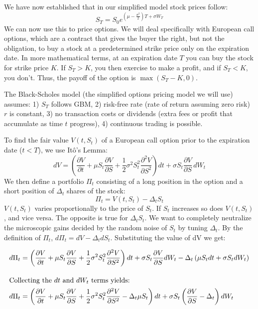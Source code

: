 \documentclass[12pt]{article}
\theoremstyle{definition}
\theoremstyle{plain}
\theoremstyle{remark}
\begin{document}
We have now established that in our simplified model stock prices follow: 
\[
S_T = S_0 e^{\left( \mu- \frac{\sigma^2}{2}\right)T + \sigma W_T}
\]
We can now use this to price options.  We will deal specifically with European call options, which are a contract that gives the buyer the right, but not the obligation, to buy a stock at a predetermined strike price only on the expiration date.  In more mathematical terms, at an expiration date $T$ you can buy the stock for strike price $K$.  If $S_T>K$, you then exercise to make a profit, and if $S_T<K$, you don't.  Thus, the payoff of the option is $\max(S_T-K,0)$.  

The Black-Scholes model (the simplified options pricing model we will use) assumes: 1) $S_T$ follows GBM, 2) risk-free rate (rate of return assuming zero risk) $r$ is constant, 3) no transaction costs or dividends (extra fees or profit that accumulate as time $t$ progress), 4) continuous trading is possible.

To find the fair value $V(t, S_t)$ of a European call option prior to the expiration date ($t<T$), we use It\^o's Lemma:
\[
dV = \left( \frac{\partial V}{\partial t} + \mu S_t\frac{\partial V}{\partial S} + \frac{1}{2} \sigma^2S_t^2 \frac{\partial^2 V}{\partial S^2} \right) dt + \sigma S_t \frac{\partial V}{\partial S} \, dW_t
\]
We then define a portfolio $\Pi_t$ consisting of a long position in the option and a short position of $\Delta_t$ shares of the stock:
\[
\Pi_t = V(t, S_t) - \Delta_t S_t
\]
$V(t, S_t)$ varies proportionally to the price of $S_t$.  If $S_t$ increases so does $V(t, S_t)$, and vice versa.  The opposite is true for $\Delta_t S_t$.  We want to completely neutralize the microscopic gains decided by the random noise of $S_t$ by tuning $\Delta_t$.  By the definition of $\Pi_t$, $d\Pi_t = dV - \Delta_t dS_t$. Substituting the value of dV we get:

\begin{align*}
d\Pi_t &= \left( \frac{\partial V}{\partial t} + \mu S_t \frac{\partial V}{\partial S} + \frac{1}{2} \sigma^2 S_t^2 \frac{\partial^2 V}{\partial S^2} \right) dt + \sigma S_t \frac{\partial V}{\partial S} dW_t - \Delta_t \left( \mu S_t dt + \sigma S_t dW_t \right) \\[10pt]
\intertext{Collecting the $dt$ and $dW_t$ terms yields:}
d\Pi_t &= \left( \frac{\partial V}{\partial t} + \mu S_t \frac{\partial V}{\partial S} + \frac{1}{2} \sigma^2 S_t^2 \frac{\partial^2 V}{\partial S^2} - \Delta_t \mu S_t \right) dt + \sigma S_t \left( \frac{\partial V}{\partial S} - \Delta_t \right) dW_t
\end{align*}
\end{document}
